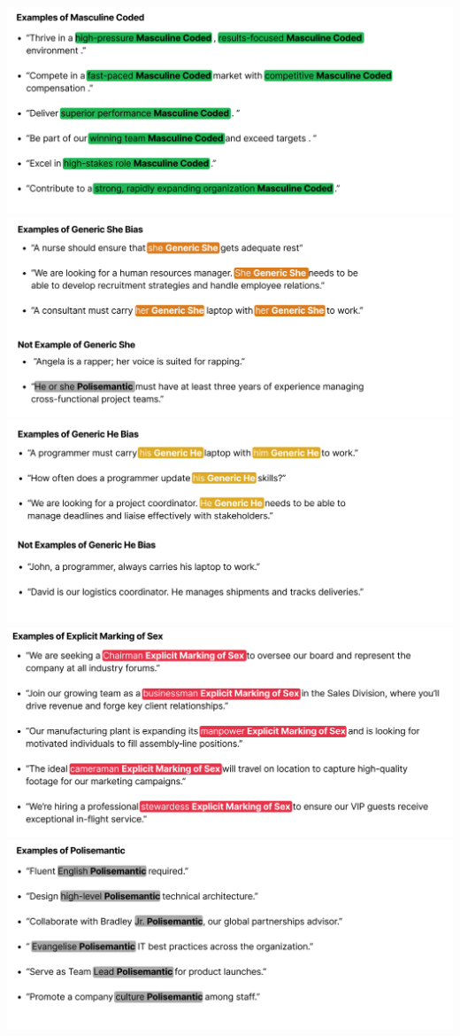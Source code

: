 \documentclass[
]{book}
\begin{document}
\includegraphics{images/Masculine-Coded.png}
\includegraphics{images/Generic-She.png}
\includegraphics{images/Generic-He.png}
\includegraphics{images/Explicit-Marking.png}
\includegraphics{images/Polisemantic.png}
\end{document}
